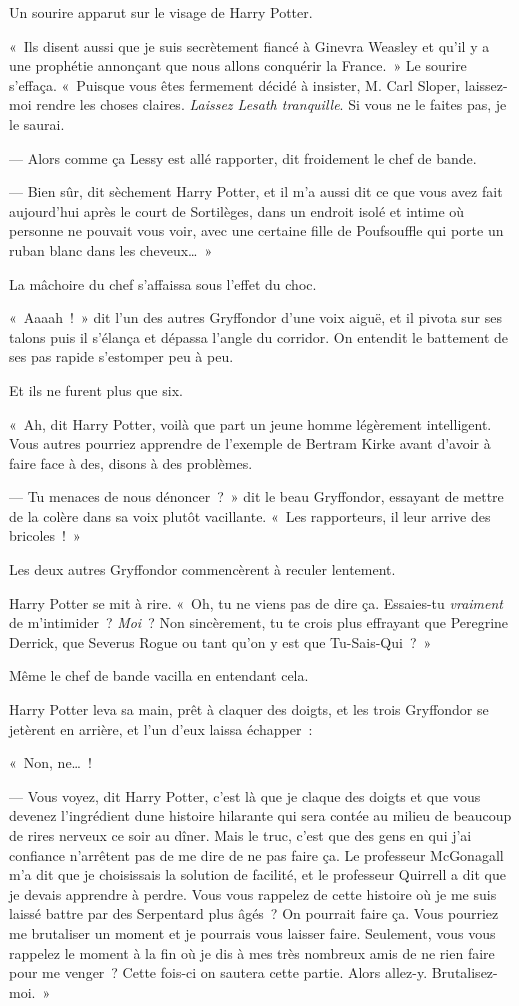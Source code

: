 Un sourire apparut sur le visage de Harry Potter.

«~Ils disent aussi que je suis secrètement fiancé à Ginevra Weasley et qu'il y a une prophétie annonçant que nous allons conquérir la France.~»
Le sourire s'effaça.
«~Puisque vous êtes fermement décidé à insister, M. Carl Sloper, laissez-moi rendre les choses claires.
\emph{Laissez Lesath tranquille}.
Si vous ne le faites pas, je le saurai.

--- Alors comme ça Lessy est allé rapporter, dit froidement le chef de bande.

--- Bien sûr, dit sèchement Harry Potter, et il m'a aussi dit ce que vous avez fait aujourd'hui après le court de Sortilèges, dans un endroit isolé et intime où personne ne pouvait vous voir, avec une certaine fille de Poufsouffle qui porte un ruban blanc dans les cheveux…~»

La mâchoire du chef s'affaissa sous l'effet du choc.

«~Aaaah~!~»
dit l'un des autres Gryffondor d'une voix aiguë, et il pivota sur ses talons puis il s'élança et dépassa l'angle du corridor.
On entendit le battement de ses pas rapide s'estomper peu à peu.

Et ils ne furent plus que six.

«~Ah, dit Harry Potter, voilà que part un jeune homme légèrement intelligent.
Vous autres pourriez apprendre de l'exemple de Bertram Kirke avant d'avoir à faire face à des, disons à des problèmes.

--- Tu menaces de nous dénoncer~?~»
dit le beau Gryffondor, essayant de mettre de la colère dans sa voix plutôt vacillante.
«~Les rapporteurs, il leur arrive des bricoles~!~»

Les deux autres Gryffondor commencèrent à reculer lentement.

Harry Potter se mit à rire.
«~Oh, tu ne viens pas de dire ça.
Essaies-tu \emph{vraiment} de m'intimider~?
\emph{Moi}~?
Non sincèrement, tu te crois plus effrayant que Peregrine Derrick, que Severus Rogue ou tant qu'on y est que Tu-Sais-Qui~?~»

Même le chef de bande vacilla en entendant cela.

Harry Potter leva sa main, prêt à claquer des doigts, et les trois Gryffondor se jetèrent en arrière, et l'un d'eux laissa échapper~:

«~Non, ne…~!

--- Vous voyez, dit Harry Potter, c'est là que je claque des doigts et que vous devenez l'ingrédient dune histoire hilarante qui sera contée au milieu de beaucoup de rires nerveux ce soir au dîner.
Mais le truc, c'est que des gens en qui j'ai confiance n'arrêtent pas de me dire de ne pas faire ça.
Le professeur McGonagall m'a dit que je choisissais la solution de facilité, et le professeur Quirrell a dit que je devais apprendre à perdre.
Vous vous rappelez de cette histoire où je me suis laissé battre par des Serpentard plus âgés~?
On pourrait faire ça.
Vous pourriez me brutaliser un moment et je pourrais vous laisser faire.
Seulement, vous vous rappelez le moment à la fin où je dis à mes très nombreux amis de ne rien faire pour me venger~?
Cette fois-ci on sautera cette partie.
Alors allez-y.
Brutalisez-moi.~»

